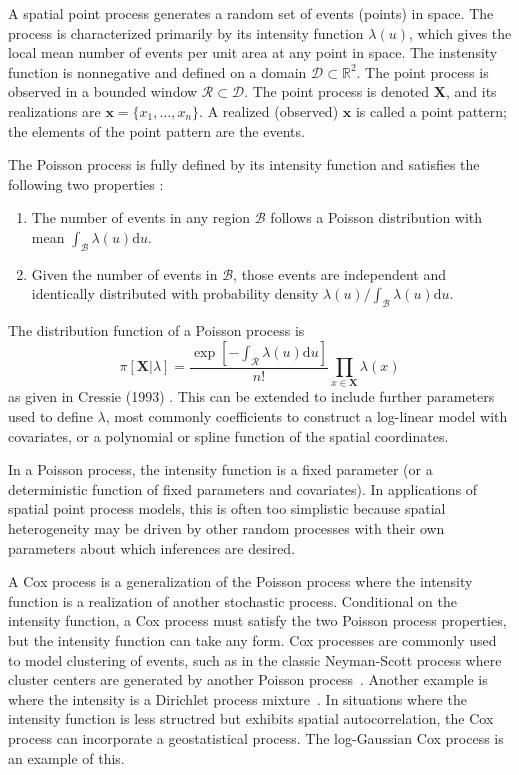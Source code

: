 \documentclass[]{interact}
\begin{document}
A spatial point process generates a random set of events (points) in space.
The process is characterized primarily by its intensity function
\(\lambda(u)\), which gives the local mean number of events per unit area at
any point in space. The instensity function is nonnegative and defined on a
domain \(\mathcal{D} \subset \mathbb{R}^{2}\). The point process is observed
in a bounded window \(\mathcal{R} \subset \mathcal{D}\). The point process is
denoted \(\mathbf{X}\), and its realizations are \(\mathbf{x} = \{x_{1},
\dots, x_{n}\}\). A realized (observed) \(\mathbf{x}\) is called a point
pattern; the elements of the point pattern are the events.

The Poisson process is fully defined by its intensity function and satisfies
the following two properties \cite{moellerwaagepetersen}:
\begin{enumerate}
\item The number of events in any region \(\mathcal{B}\) follows a Poisson
distribution with mean
\(\int_{\mathcal{B}} \lambda(u)\mathrm{d}u\).
\item Given the number of events in \(\mathcal{B}\), those events are
independent and identically distributed with probability density
\(\lambda(u) / \int_{\mathcal{B}} \lambda(u)\mathrm{d}u\).
\end{enumerate}
The distribution function of a Poisson process is
\begin{displaymath}
\pi[\mathbf{X}|\lambda]
= \frac{\exp\left[-\int_{\mathcal{R}} \lambda(u) \mathrm{d}u\right]}
{n!} \prod_{x \in \mathbf{X}} \lambda(x)
\end{displaymath}
as given in Cressie (1993) \cite{cressie}. This can be extended to include
further parameters used to define \(\lambda\), most commonly coefficients
to construct a log-linear model with covariates, or a polynomial or spline
function of the spatial coordinates.

In a Poisson process, the intensity function is a fixed parameter (or a
deterministic function of fixed parameters and covariates). In applications of
spatial point process models, this is often too simplistic because spatial
heterogeneity may be driven by other random processes with their own parameters
about which inferences are desired.

A Cox process is a generalization of the Poisson process where the intensity
function is a realization of another stochastic process. Conditional on the
intensity function, a Cox process must satisfy the two Poisson process
properties, but the intensity function can take any form. Cox processes are
commonly used to model clustering of events, such as in the classic
Neyman-Scott process where cluster centers are generated by another Poisson
process~\cite{neymanscott}. Another example is where the intensity is a
Dirichlet process mixture~\cite{taddy}. In situations where the intensity
function is less structred but exhibits spatial autocorrelation, the Cox
process can incorporate a geostatistical process. The log-Gaussian Cox process
is an example of this.
\end{document}
